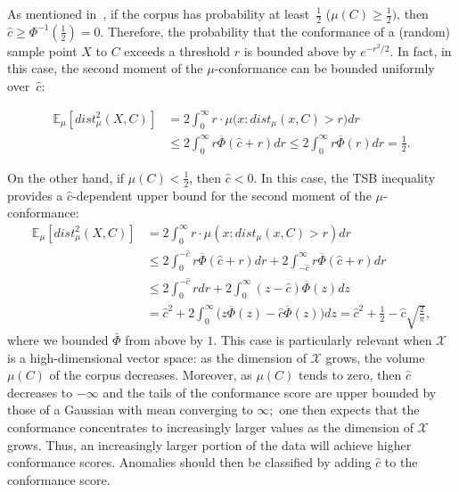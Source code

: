 \documentclass[twoside,11pt]{article}
\numberwithin{equation}{section}
\numberwithin{theorem}{section}
\newcommand{\X}{\mathcal{X}}
\newcommand{\ex}{\mathbb{E}}
\begin{document}
\begin{remark}\label{remark:concentration} As mentioned in~\citep{cochrane2020anomaly}, if the corpus has probability at least~$\frac{1}{2}$ 
($\mu(C)\geq \frac{1}{2})$, then $\widehat{c}\geq \Phi^{-1}(\frac{1}{2})=0$.  Therefore, the probability that the conformance of a (random) sample point $X$ to $C$ exceeds a threshold $r$ is  bounded above by $e^{-r^2/2}$. In fact, in this case, the second moment of the $\mu$-conformance can be bounded uniformly over~$\widehat{c}$:

\begin{equation*} \begin{aligned}
\ex_\mu\left[dist^2_{\mu}(X, C)\right]
 &= 2\int_{0}^{\infty}r\cdot\mu\big(x: dist_{\mu}(x,C)>r\big)dr\\&
 \leq 2\int _{0}^{\infty}r\overline{\Phi}(\widehat{c}+r)dr\leq
 2\int _{0}^{\infty}r\overline{\Phi}(r)dr=\frac{1}{2}.
     \end{aligned}
 \end{equation*}

 On the other hand, if $\mu(C)<\frac{1}{2}$, then $\widehat{c}<0$. In this case, the TSB inequality provides a $\widehat{c}$-dependent upper bound for the second moment of the $\mu$-conformance:
 \begin{equation*}
\begin{aligned}
 \ex_\mu\left[dist^2_{\mu}(X, C)\right]
  &= 2\int_{0}^{\infty}r\cdot\mu(x: dist_{\mu}(x,C)>r)dr\\&
 \leq 2\int _{0}^{-\widehat{c}}r\overline{\Phi}(\widehat{c}+r)dr+2\int _{-\widehat{c}}^{\infty}r\overline{\Phi}(\widehat{c}+r)dr
 \\&\leq 
 2\int _{0}^{-\widehat{c}}rdr+2\int _{0}^{\infty}(z-\widehat{c})\overline{\Phi}(z)dz
\\&=\widehat{c}^2+2\int _{0}^{\infty}\bigg(z\overline{\Phi}(z)-\widehat{c}\overline{\Phi}(z)\bigg)dz
=\widehat{c}^2+\frac{1}{2}-\widehat{c}\sqrt{\frac{2}{\pi}},
     \end{aligned}
 \end{equation*}
where we bounded $\bar{\Phi}$ from above by $1.$  This case is particularly relevant when $\X$ is a high-dimensional vector space: as the dimension of $\X$ grows, the volume $\mu(C)$ of the corpus decreases. 
Moreover, as $\mu(C)$ tends to zero, then $\widehat{c}$ decreases to $-\infty$ and the tails of the conformance score are upper bounded by those of a Gaussian with mean converging to $\infty;$ one then expects that the conformance concentrates to increasingly larger values as the dimension of $\X$ grows.
 Thus, an increasingly larger portion of the data will achieve higher conformance scores. Anomalies should then be classified by adding $\widehat{c}$ to the conformance score.
\end{remark}
\end{document}
